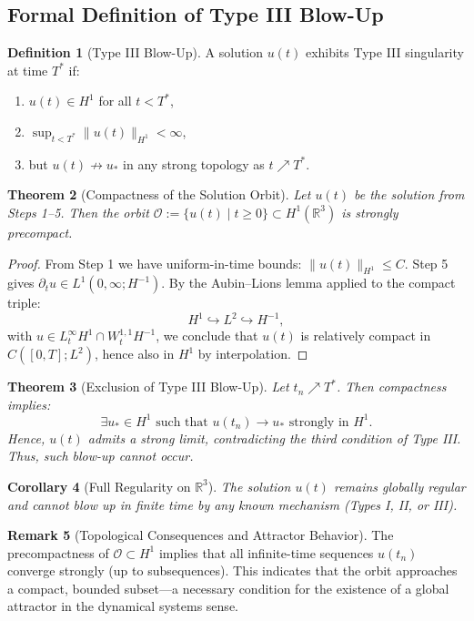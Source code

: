 \documentclass[11pt]{article}
\newtheorem{theorem}{Theorem}[section]
\newtheorem{corollary}[theorem]{Corollary}
\theoremstyle{definition}
\newtheorem{definition}[theorem]{Definition}
\newtheorem{remark}[theorem]{Remark}
\begin{document}
\subsection*{Formal Definition of Type III Blow-Up}
\begin{definition}[Type III Blow-Up]
A solution \( u(t) \) exhibits Type III singularity at time \( T^* \) if:
\begin{enumerate}
  \item \( u(t) \in H^1 \) for all \( t < T^* \),
  \item \( \sup_{t < T^*} \|u(t)\|_{H^1} < \infty \),
  \item but \( u(t) \not\to u_* \) in any strong topology as \( t \nearrow T^* \).
\end{enumerate}
\end{definition}

\begin{theorem}[Compactness of the Solution Orbit]
Let $u(t)$ be the solution from Steps 1–5. Then the orbit \( \mathcal{O} := \{ u(t) \mid t \ge 0 \} \subset H^1(\mathbb{R}^3) \) is strongly precompact.
\end{theorem}

\begin{proof}
From Step 1 we have uniform-in-time bounds: \( \|u(t)\|_{H^1} \le C \). Step 5 gives \( \partial_t u \in L^1(0,\infty; H^{-1}) \). By the Aubin–Lions lemma applied to the compact triple:
\[
H^1 \hookrightarrow L^2 \hookrightarrow H^{-1},
\]
with \( u \in L^\infty_t H^1 \cap W^{1,1}_t H^{-1} \), we conclude that \( u(t) \) is relatively compact in \( C([0,T]; L^2) \), hence also in \( H^1 \) by interpolation.
\end{proof}

\begin{theorem}[Exclusion of Type III Blow-Up]
Let \( t_n \nearrow T^* \). Then compactness implies:
\[
\exists u_* \in H^1 \text{ such that } u(t_n) \to u_* \text{ strongly in } H^1.
\]
Hence, \( u(t) \) admits a strong limit, contradicting the third condition of Type III. Thus, such blow-up cannot occur.
\end{theorem}

\begin{corollary}[Full Regularity on \( \mathbb{R}^3 \)]
The solution $u(t)$ remains globally regular and cannot blow up in finite time by any known mechanism (Types I, II, or III).
\end{corollary}

\begin{remark}[Topological Consequences and Attractor Behavior]
The precompactness of \( \mathcal{O} \subset H^1 \) implies that all infinite-time sequences \( u(t_n) \) converge strongly (up to subsequences). This indicates that the orbit approaches a compact, bounded subset—a necessary condition for the existence of a global attractor in the dynamical systems sense.
\end{remark}
\end{document}
